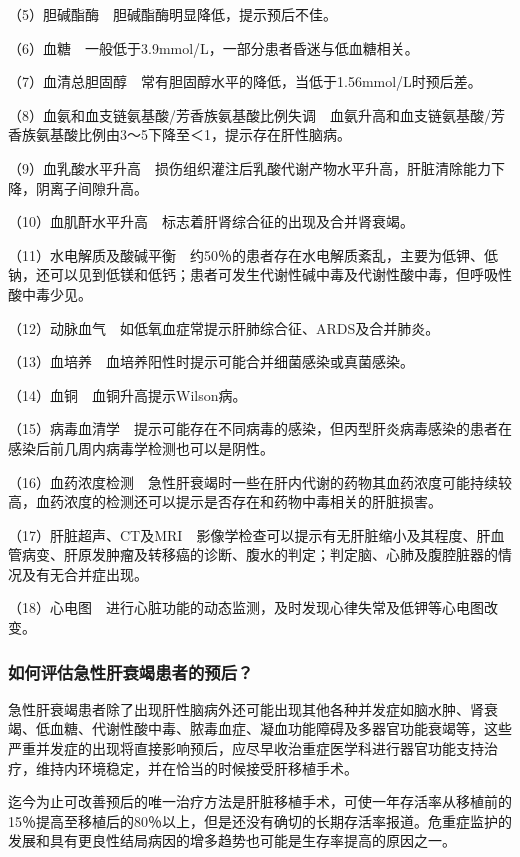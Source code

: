 （5）胆碱酯酶　胆碱酯酶明显降低，提示预后不佳。

（6）血糖　一般低于3.9mmol/L，一部分患者昏迷与低血糖相关。

（7）血清总胆固醇　常有胆固醇水平的降低，当低于1.56mmol/L时预后差。

（8）血氨和血支链氨基酸/芳香族氨基酸比例失调　血氨升高和血支链氨基酸/芳香族氨基酸比例由3～5下降至＜1，提示存在肝性脑病。

（9）血乳酸水平升高　损伤组织灌注后乳酸代谢产物水平升高，肝脏清除能力下降，阴离子间隙升高。

（10）血肌酐水平升高　标志着肝肾综合征的出现及合并肾衰竭。

（11）水电解质及酸碱平衡　约50％的患者存在水电解质紊乱，主要为低钾、低钠，还可以见到低镁和低钙；患者可发生代谢性碱中毒及代谢性酸中毒，但呼吸性酸中毒少见。

（12）动脉血气　如低氧血症常提示肝肺综合征、ARDS及合并肺炎。

（13）血培养　血培养阳性时提示可能合并细菌感染或真菌感染。

（14）血铜　血铜升高提示Wilson病。

（15）病毒血清学　提示可能存在不同病毒的感染，但丙型肝炎病毒感染的患者在感染后前几周内病毒学检测也可以是阴性。

（16）血药浓度检测　急性肝衰竭时一些在肝内代谢的药物其血药浓度可能持续较高，血药浓度的检测还可以提示是否存在和药物中毒相关的肝脏损害。

（17）肝脏超声、CT及MRI　影像学检查可以提示有无肝脏缩小及其程度、肝血管病变、肝原发肿瘤及转移癌的诊断、腹水的判定；判定脑、心肺及腹腔脏器的情况及有无合并症出现。

（18）心电图　进行心脏功能的动态监测，及时发现心律失常及低钾等心电图改变。

\subsubsection{如何评估急性肝衰竭患者的预后？}

急性肝衰竭患者除了出现肝性脑病外还可能出现其他各种并发症如脑水肿、肾衰竭、低血糖、代谢性酸中毒、脓毒血症、凝血功能障碍及多器官功能衰竭等，这些严重并发症的出现将直接影响预后，应尽早收治重症医学科进行器官功能支持治疗，维持内环境稳定，并在恰当的时候接受肝移植手术。

迄今为止可改善预后的唯一治疗方法是肝脏移植手术，可使一年存活率从移植前的15％提高至移植后的80％以上，但是还没有确切的长期存活率报道。危重症监护的发展和具有更良性结局病因的增多趋势也可能是生存率提高的原因之一。

